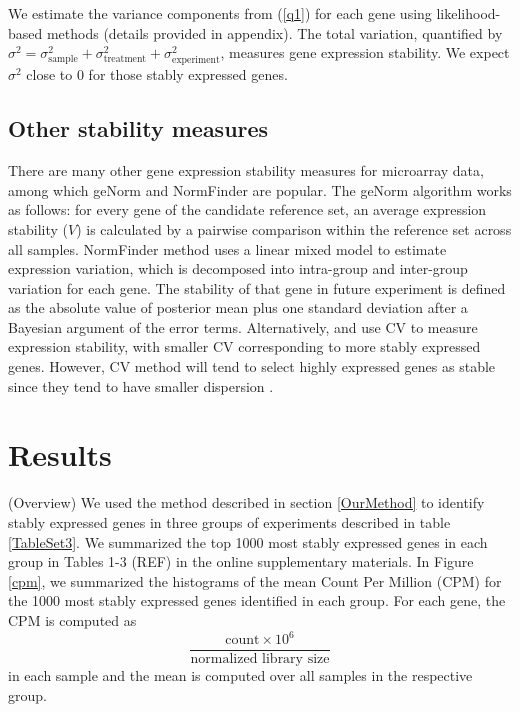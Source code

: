 \documentclass[11pt, a4paper]{article}
\begin{document}
We estimate the variance components from (\ref{q1}) for each gene using
likelihood-based methods (details provided in appendix).  The total
variation, quantified by $\sigma^2 =\sigma_{\text{sample}}^2+ \sigma_{\text{treatment}}^2+ \sigma_{\text{experiment}}^2$, measures gene expression stability. We expect $\sigma^2$ close to 0 for those stably expressed genes.

\subsection{Other stability measures}
There are many other gene expression stability measures for microarray data, among which geNorm \citep{vandesompele2002accurate} and NormFinder \citep{andersen2004normalization} are popular. The geNorm algorithm works as follows: for every gene of the candidate reference set, an average expression stability ($V$) is calculated by a pairwise comparison within the reference set across all samples. NormFinder method uses a linear mixed model to estimate expression variation, which is decomposed into intra-group and inter-group variation for each gene. The stability of that gene in future experiment is defined as the absolute value of posterior mean plus one standard deviation after a Bayesian argument of the error terms. Alternatively, \cite{czechowski2005genome} and \cite{dekkers2012identification} use CV to measure expression stability, with smaller CV corresponding to more stably expressed genes. However, CV method will tend to select highly expressed genes as stable since they tend to have smaller dispersion \citep{hruz2011refgenes}. 

 \section{Results}\label{Results}
(Overview) We used the method described in section \ref{OurMethod} to identify stably
expressed genes in three groups of experiments described in table \ref{TableSet3}.%
 We summarized the top 1000 most stably expressed
genes in each group in Tables 1-3 (REF) in the online supplementary materials.
In Figure \ref{cpm}, we summarized the histograms of the mean Count Per Million
(CPM) for the 1000 most stably expressed genes identified in each group. For
each gene, the CPM is computed as \[ \dfrac{ \text{count}
	\times 10^6 }{ \text{normalized library size}} \] in each sample and the mean is computed
over all samples in the respective group.
 
\end{document}
